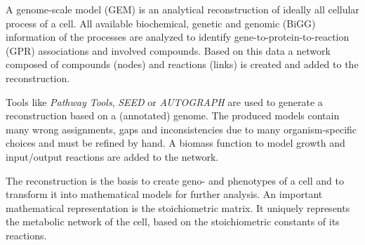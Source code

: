 % 

A genome-scale model (GEM) is an analytical reconstruction of ideally all cellular process of a cell.
All available biochemical, genetic and genomic (BiGG) information of the processes are analyzed to
identify gene-to-protein-to-reaction (GPR) associations and involved compounds. 
Based on this data a network composed of compounds (nodes) and reactions (links) is created and added
to the reconstruction.
\cite{palsson2015systems}

Tools like \textit{Pathway Tools}\cite{karp2009pathway},
\textit{SEED}\cite{henry2010high} or \textit{AUTOGRAPH}\cite{notebaart2006accelerating} are used to
generate a reconstruction based on a (annotated) genome. The produced models contain many
wrong assignments, gaps and inconsistencies due to many organism-specific choices and must be refined by hand.
A biomass function to model growth and input/output reactions are added to
the network\cite{santos_practical_2011}.

The reconstruction is the basis to create geno- and phenotypes of a cell and to transform it into
mathematical models for further analysis.
An important mathematical representation is the stoichiometric matrix. It uniquely represents the metabolic
network of the cell, based on the stoichiometric constants of its reactions\cite{palsson2015systems}.

